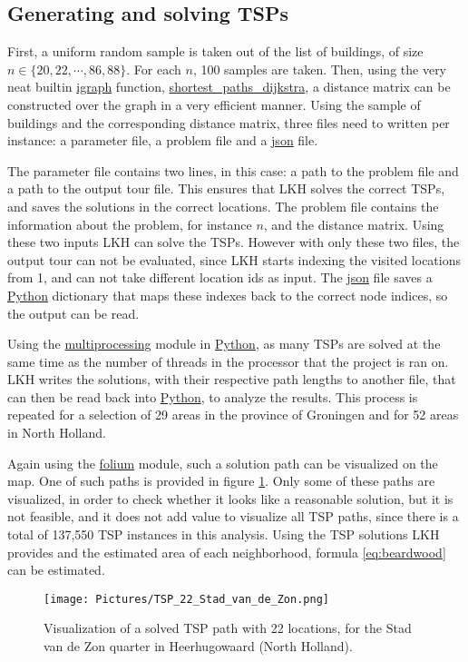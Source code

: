 \subsection{Generating and solving TSPs}
First, a uniform random sample is taken out of the list of buildings, of size\\
$n\in\{20, 22, \cdots, 86, 88\}$. For each $n$, 100 samples are taken. Then, using the very neat
builtin \url{igraph} function, \url{shortest_paths_dijkstra}, a distance matrix can be constructed
over the graph in a very efficient manner. Using the sample of buildings and the corresponding 
distance matrix, three files need to written per instance: a parameter file, a problem file and a 
\url{json} file.

The parameter file contains two lines, in this case: a path to the problem file and a path to the
output tour file. This ensures that LKH solves the correct TSPs, and saves the solutions in the 
correct locations. The problem file contains the information about the problem, for instance
$n$, and the distance matrix. Using these two inputs LKH can solve the TSPs. However with only these 
two files, the output tour can not be evaluated, since LKH starts indexing the visited locations
from 1, and can not take different location ids as input. The \url{json} file saves a \url{Python}
dictionary that maps these indexes back to the correct node indices, so the output can be read.

Using the \url{multiprocessing} module in \url{Python}, as many TSPs are solved at the same time
as the number of threads in the processor that the project is ran on. LKH writes the solutions,
with their respective path lengths to another file, that can then be read back into \url{Python},
to analyze the results. This process is repeated for a selection of 29 areas in the province of
Groningen and for 52 areas in North Holland.

Again using the \url{folium} module, such a solution path can be visualized on the map. One of such
paths is provided in figure \ref{fig:tsp_stadvdzon}. Only some of these paths are visualized,
in order to check whether it looks like a reasonable solution, but it is not feasible, and it does
not add value to visualize all TSP paths, since there is a total of 137,550 TSP instances in this analysis.
Using the TSP solutions LKH provides and the estimated area of each neighborhood, formula 
\ref{eq:beardwood} can be estimated.
\begin{figure}[H]
  \caption{Visualization of a solved TSP path with 22 locations, for the Stad van de Zon quarter in 
  Heerhugowaard (North Holland).}
  \label{fig:tsp_stadvdzon}
  \texttt{[image: Pictures/TSP\_22\_Stad\_van\_de\_Zon.png]}
\end{figure}
